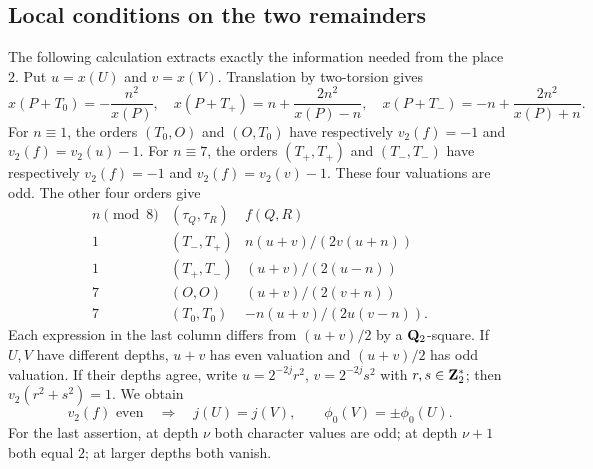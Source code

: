 \subsection{Local conditions on the two remainders}

The following calculation extracts exactly the information needed from
the place $2$.  Put $u=x(U)$ and $v=x(V)$.  Translation by two-torsion gives
\begin{equation}\label{eq:cs-translations}
 x(P+T_0)=-\frac{n^2}{x(P)},\quad
 x(P+T_+)=n+\frac{2n^2}{x(P)-n},\quad
 x(P+T_-)=-n+\frac{2n^2}{x(P)+n}.
\end{equation}
For $n\equiv1$, the orders $(T_0,O)$ and $(O,T_0)$ have respectively
$v_2(f)=-1$ and $v_2(f)=v_2(u)-1$.  For $n\equiv7$, the orders
$(T_+,T_+)$ and $(T_-,T_-)$ have respectively $v_2(f)=-1$ and
$v_2(f)=v_2(v)-1$.  These four valuations are odd.  The other four orders
give
\begin{equation}\label{eq:cs-surviving-formulas}
\begin{array}{c|c|c}
n\pmod8&(\tau_Q,\tau_R)&f(Q,R)\\ \hline
1&(T_-,T_+)&n(u+v)/(2v(u+n))\\
1&(T_+,T_-)&(u+v)/(2(u-n))\\
7&(O,O)&(u+v)/(2(v+n))\\
7&(T_0,T_0)&-n(u+v)/(2u(v-n)).
\end{array}
\end{equation}
Each expression in the last column differs from $(u+v)/2$ by a
$\mathbf Q_2$-square.  If $U,V$ have different depths, $u+v$ has even valuation
and $(u+v)/2$ has odd valuation.  If their depths agree, write
$u=2^{-2j}r^2$, $v=2^{-2j}s^2$ with $r,s\in\mathbf Z_2^*$; then
$v_2(r^2+s^2)=1$.  We obtain
\begin{equation}\label{eq:cs-sign-match}
 v_2(f)\text{ even}\quad\Longrightarrow\quad
 j(U)=j(V),\qquad \phi_0(V)=\pm\phi_0(U).
\end{equation}
For the last assertion, at depth $\nu$ both character values are odd;
at depth $\nu+1$ both equal $2$; at larger depths both vanish.

